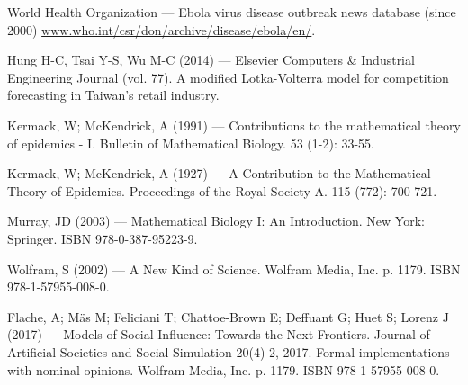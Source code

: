 %
%
% 
% 
%

\begin{thebibliography}{99.}

 World Health Organization --- Ebola virus disease outbreak news database (since 2000) 
\url{www.who.int/csr/don/archive/disease/ebola/en/}.

 Hung H-C, Tsai Y-S, Wu M-C (2014) --- Elsevier Computers \& Industrial Engineering 
Journal (vol. 77). A modified Lotka-Volterra model for competition forecasting in Taiwan's retail industry.

 Kermack, W; McKendrick, A (1991) --- Contributions to the mathematical theory of epidemics - I. Bulletin of Mathematical Biology. 53 (1-2): 33-55.

 Kermack, W; McKendrick, A (1927) --- A Contribution to the Mathematical Theory of Epidemics. Proceedings of the Royal Society A. 115 (772): 700-721.

 Murray, JD (2003) --- Mathematical Biology I: An Introduction. 
New York: Springer. ISBN 978-0-387-95223-9.

 Wolfram, S (2002) --- A New Kind of Science. 
Wolfram Media, Inc. p. 1179. ISBN 978-1-57955-008-0.

 Flache, A; M\"{a}s M; Feliciani T; Chattoe-Brown E; Deffuant G; Huet S; Lorenz J (2017) --- Models of Social Influence: Towards the Next Frontiers.
Journal of Artificial Societies and Social Simulation 20(4) 2, 2017. Formal implementations with nominal opinions.  
Wolfram Media, Inc. p. 1179. ISBN 978-1-57955-008-0.

\end{thebibliography}
